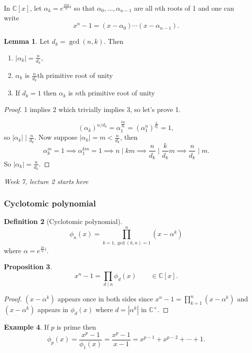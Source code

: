 \documentclass[a4paper]{article}
\newcommand{\C}{\mathbb{C}}
\theoremstyle{definition}
\newtheorem{defn}{Definition}[subsection]
\newtheorem{prop}[defn]{Proposition}
\newtheorem{lemma}[defn]{Lemma}
\newtheorem{example}[defn]{Example}
\begin{document}
In $\C[x]$, let $\alpha_k=e^{\frac{2\pi k}{n}i}$ so that $\alpha_0,\ldots,\alpha_{n-1}$ are all $n$th roots of 1 and one can write
\[
x^n-1=(x-\alpha_0)\cdots(x-\alpha_{n-1}).
\]

\begin{lemma}
Let $d_k=\gcd(n,k)$. Then
\begin{enumerate}
\item $|\alpha_k|=\frac{n}{d_k}$,
\item $\alpha_k$ is $\frac{n}{d_k}$th primitive root of unity
\item If $d_k=1$ then $\alpha_k$ is $n$th primitive root of unity
\end{enumerate}
\end{lemma}
\begin{proof}
1 implies 2 which trivially implies 3, so let's prove 1.

\[
(\alpha_k)^{n/d_k}=\alpha_1^{\frac{kn}{d_k}}=(\alpha_1^n)^{\frac{k}{d_k}}=1,
\] 
so $|\alpha_k|\mid \frac{n}{d_k}$. Now suppose $|\alpha_k|=m<\frac{n}{d_k}$, then
\[
\alpha_k^m=1\implies \alpha_1^{km}=1\implies n\mid km\implies \frac{n}{d_k}\mid \frac{k}{d_k}m\implies \frac{n}{d_k}\mid m.
\]
So $|\alpha_k|=\frac{n}{d_k}$.
\end{proof}

\begin{flushright}
\textit{Week 7, lecture 2 starts here}
\end{flushright}

\subsubsection{Cyclotomic polynomial}

\begin{defn}[Cyclotomic polynomial]
\[
\phi_n(x)=\prod_{k=1,\gcd(k,n)=1}^n \left(x-\alpha^k\right)
\]
where $\alpha=e^{\frac{2\pi}{n}i}$.
\end{defn}

\begin{prop}
\label{prop:xn-1isprodphidx}
\[
x^n-1=\prod_{d\mid n}\phi_d(x)\qquad\in\C[x].
\]
\end{prop}
\begin{proof}
$(x-\alpha^k)$ appears once in both sides since $x^n-1=\prod_{k=1}^n \left(x-\alpha^k\right)$ and $(x-\alpha^k)$ appears in $\phi_d(x)$ where $d=|\alpha^k|$ in $\C^\times$.
\end{proof}

\begin{example}
If $p$ is prime then
\[
\phi_p(x)=\frac{x^p-1}{\phi_1(x)}=\frac{x^p-1}{x-1}=x^{p-1}+x^{p-2}+\cdots+1.
\]
\end{example}
\end{document}
